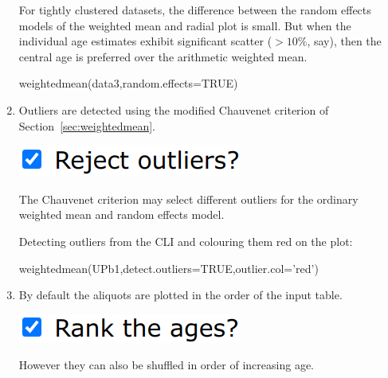 \begin{refsection}
\begin{enumerate}
For tightly clustered datasets, the difference between the random
effects models of the weighted mean and radial plot is small.  But
when the individual age estimates exhibit significant scatter
($>10$\%, say), then the central age is preferred over the arithmetic
weighted mean.

\begin{console}
weightedmean(data3,random.effects=TRUE)
\end{console}
  
\item Outliers are detected using the modified Chauvenet criterion of
  Section~\ref{sec:weightedmean}.

\noindent\begin{minipage}[t]{.2\linewidth}
\strut\vspace*{-\baselineskip}\newline
  \includegraphics[width=\linewidth]{../figures/OtherWtdMeanOutliers.png}
\end{minipage}
\begin{minipage}[t]{.8\linewidth}
  The Chauvenet criterion may select different outliers for the
  ordinary weighted mean and random effects model.
\end{minipage}

Detecting outliers from the CLI and colouring them red on the plot:
\begin{console}
weightedmean(UPb1,detect.outliers=TRUE,outlier.col='red')
\end{console}

\item By default the aliquots are plotted in the order of the input
  table.

\noindent\begin{minipage}[t]{.2\linewidth}
\strut\vspace*{-\baselineskip}\newline
  \includegraphics[width=\linewidth]{../figures/OtherWtdMeanRank.png}
\end{minipage}
\begin{minipage}[t]{.8\linewidth}
However they can also be shuffled in order of increasing age.
\end{minipage}


\end{enumerate}
\end{refsection}
